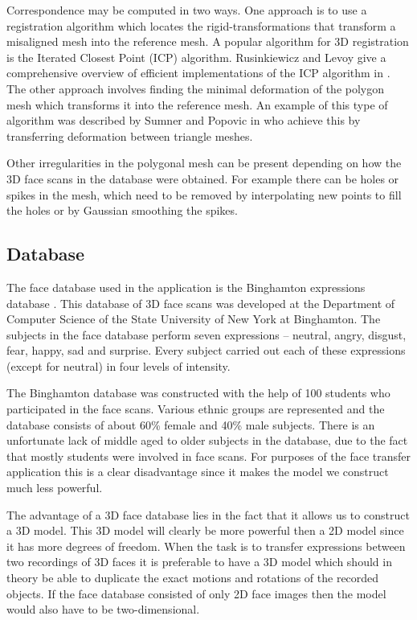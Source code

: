 \documentclass[11pt,a4paper]{report}
\begin{document}
Correspondence may be computed in two ways. One approach is to use a
registration algorithm which locates the rigid-transformations that transform a misaligned mesh into the reference mesh. A popular algorithm
for 3D registration is the Iterated Closest Point (ICP) algorithm. Rusinkiewicz
and Levoy give a comprehensive overview of efficient implementations of the ICP
algorithm in \cite{ICP}. The other approach involves finding the minimal deformation of
the polygon mesh which transforms it into the reference mesh. An example of this
type of algorithm was described by Sumner and Popovic in \cite{deformTri}
who achieve this by transferring deformation between triangle meshes.

Other irregularities in the polygonal mesh can be present depending on how the
3D face scans in the database were obtained. For example there can be holes or spikes in the
mesh, which need to be removed by interpolating new points to fill the holes or
by Gaussian smoothing the spikes. 

\subsection{Database}
The face database used in the application is the Binghamton expressions database \cite{binghamton}. This database of 3D face scans was developed at the Department of
Computer Science of the State University of New York at Binghamton. The subjects 
in the face database perform seven expressions -- neutral, angry,
disgust, fear, happy, sad and surprise. Every subject carried out each of these
expressions (except for neutral) in four levels of intensity. 

The Binghamton database was constructed with the help of 100 students who participated in the face
scans. Various ethnic groups are represented and the database consists of about
60\% female and 40\% male subjects. There is an unfortunate lack of middle aged to older
 subjects in the database, due to the fact that mostly students were
involved in face scans. For purposes of the face transfer application this is a clear
disadvantage since it makes the model we construct much less powerful.

The advantage of a 3D face database lies in the fact that it allows us to
construct a 3D model. This 3D model will clearly be more powerful then a 2D
model since it has more degrees of freedom. When the task is to transfer
expressions between two recordings of 3D faces it is preferable to have a 3D model
which should in theory be able to duplicate the exact motions and rotations of the recorded
objects. If the face database consisted of only 2D face images then the model
would also have to be two-dimensional.
\end{document}
